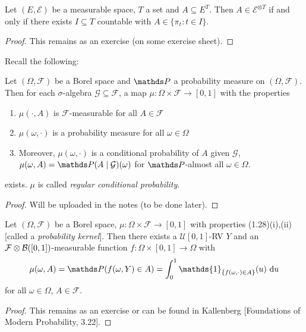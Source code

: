 \begin{lem}
Let $(E,\mathcal{E})$ be a measurable space, $T$ a set and $A \subseteq E^T$. Then $A \in \mathcal{E}^{\otimes T}$ if and only if there exists $I\subseteq T$ countable with $A \in \{\pi_t\colon t\in I\}$.
\end{lem}
\begin{proof}
This remains as an exercise (on some exercise sheet).
\end{proof}
Recall the following:
\begin{thm}
Let $(\Omega,\mathcal{F})$ be a Borel space and $\Prob$ a probability measure on $(\Omega,\mathcal{F})$.
Then for each $\sigma$-algebra $\mathcal{G} \subseteq \mathcal{F}$, a map
$\mu \colon \Omega \times \mathcal{F} \to [0,1]$ with the properties
\begin{enumerate}[label=(\roman*)]
\item $\mu(\cdot,A)$ is $\mathcal{F}$-measurable for all $A \in \mathcal{F}$
\item $\mu(\omega,\cdot)$ is a probability measure for all $\omega \in \Omega$
\item Moreover, $\mu(\omega,\cdot)$ is a conditional probability of $A$ given $\mathcal{G}$, \ie $\mu(\omega,A)=\Prob(A\mid \mathcal{G})(\omega)$ for $\Prob$-almost all $\omega \in \Omega$.
\end{enumerate}
exists. $\mu$ is called \emph{regular conditional probability}.
\end{thm}
\begin{proof}
Will be uploaded in the notes (to be done later).
\end{proof}

\begin{lem}
Let $(\Omega,\mathcal{F})$ be a Borel space, $\mu \colon \Omega \times \mathcal{F} \to [0,1]$ with properties (1.28)(i),(ii) [called a \emph{probability kernel}].
Then there exists a $\mathcal{U}[0,1]$-RV $Y$ and an $\mathcal{F} \otimes \mathcal{B}([0,1])$-measurable function
$f \colon \Omega \times [0,1] \to \Omega$ with
\begin{align*}
\mu(\omega,A)=\Prob(f(\omega,Y)\in A)= \int_0^1 \mathds{1}_{\{f(\omega,\cdot) \in A\}}(u)~\mathrm{d}u
\end{align*}
for all $\omega \in \Omega$, $A \in \mathcal{F}$.
\end{lem}
\begin{proof}
This remains as an exercise or can be found in Kallenberg [Foundations of Modern Probability, 3.22].
\end{proof}

